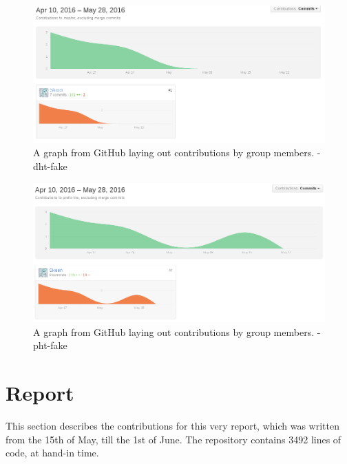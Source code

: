 \begin{figure}[H]
  \centering
    \includegraphics[width=\linewidth]{gfx/dht-fake}
    \caption{A graph from GitHub laying out contributions by group members. - dht-fake}
  \label{fig:dht}
\end{figure}

\begin{figure}[H]
  \centering
    \includegraphics[width=\linewidth]{gfx/pht-fake}
    \caption{A graph from GitHub laying out contributions by group members. - pht-fake}
  \label{fig:pht}
\end{figure}

\section{Report}
This section describes the contributions for this very report, which was
written from the 15th of May, till the 1st of June.
\newline\newline
The repository contains 3492 lines of code, at hand-in time.

